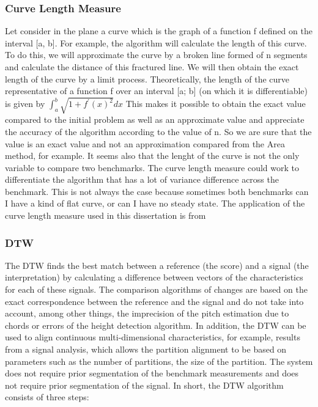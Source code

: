 \documentclass{article}
\begin{document}
\subsubsection{Curve Length Measure}


Let consider in the plane a curve \citep{moran1966measuring} which is the graph of a function f defined on the interval [a, b]. For example, the algorithm will calculate the length of this curve. To do this, we will approximate the curve by a broken line formed of n segments and calculate the distance of this fractured line. We will then obtain the exact length of the curve by a limit process.
Theoretically, the length of the curve representative of a function f over an interval [a; b] (on which it is differentiable) is given by $\int_{a}^{b} \sqrt{1+f^{\prime}(x)^{2}} d x$
This makes it possible to obtain the exact value compared to the initial problem as well as an approximate value and appreciate the accuracy of the algorithm according to the value of n. So we are sure that the value is an exact value and not an approximation compared from the Area method, for example. It seems also that the lenght of the curve is not the only variable to compare two benchmarks.
The curve length measure could work to differentiate the algorithm that has a lot of variance difference across the benchmark. This is not always the case because sometimes both benchmarks can I have a kind of flat curve, or can I have no steady state.
The application of the curve length measure used in this dissertation is from \citep{jekel2019similarity}


\subsubsection{DTW}

 The DTW finds the best match between a reference (the score) and a signal (the interpretation) by calculating a difference between vectors of the characteristics for each of these signals. The comparison algorithms of changes are based on the exact correspondence between the reference and the signal and do not take into account, among other things, the imprecision of the pitch estimation due to chords or errors of the height detection algorithm. In addition, the DTW can be used to align continuous multi-dimensional characteristics, for example, results from a signal analysis, which allows the partition alignment to be based on parameters such as the number of partitions, the size of the partition.
The system does not require prior segmentation of the benchmark measurements and does not require prior segmentation of the
signal.
In short, the DTW algorithm consists of three steps:
\end{document}
